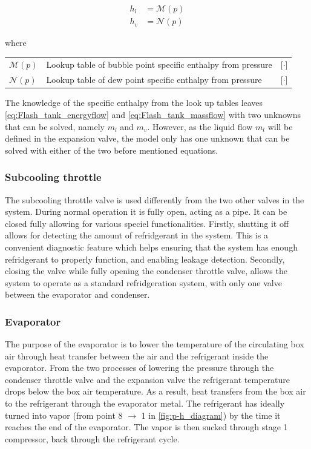 \begin{align}
	h_{l}  & = \mathcal{M}(p)\\
	h_{v}  & = \mathcal{N}(p)
\end{align}

where

\begin{center}
	\begin{tabular}{l p{10cm} l}
		$\mathcal{M}(p)$ & Lookup table of bubble point specific enthalpy from pressure & [$\cdot$] \\
		$\mathcal{N}(p)$ & Lookup table of dew point specific enthalpy from pressure    & [$\cdot$]
	\end{tabular}
\end{center}

The knowledge of the specific enthalpy from the look up tables leaves \cref{eq:Flash_tank_energyflow} and \cref{eq:Flash_tank_massflow} with two unknowns that can be solved, namely $ m_l $ and $ m_v $. However, as the liquid flow $ m_l $ will be defined in the expansion valve, the model only has one unknown that can be solved with either of the two before mentioned equations.



\subsubsection{Subcooling throttle}
The subcooling throttle valve is used differently from the two other valves in the system. During normal operation it is fully open, acting as a pipe. It can be closed fully allowing for various speciel functionalities. Firstly, shutting it off allows for detecting the amount of refridgerant in the system. This is a convenient diagnostic feature which helps ensuring that the system has enough refridgerant to properly function, and enabling leakage detection. Secondly, closing the valve while fully opening the condenser throttle valve, allows the system to operate as a standard refridgeration system, with only one valve between the evaporator and condenser.



\newpage
\subsubsection{Evaporator}\label{sec:evaporator}
The purpose of the evaporator is to lower the temperature of the circulating box air through heat transfer between the air and the refrigerant inside the evaporator. From the two processes of lowering the pressure through the condenser throttle valve and the expansion valve the refrigerant temperature drops below the box air temperature. As a result, heat transfers from the box air to the refrigerant through the evaporator metal. The refrigerant has ideally turned into vapor (from point 8 $\rightarrow$ 1 in \cref{fig:p-h_diagram}) by the time it reaches the end of the evaporator. The vapor is then sucked through stage 1 compressor, back through the refrigerant cycle.

